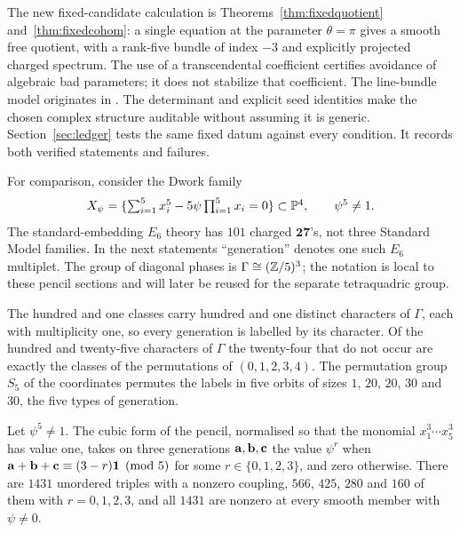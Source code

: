 The new fixed-candidate calculation is
Theorems~\ref{thm:fixedquotient} and~\ref{thm:fixedcohom}:
a single equation at the parameter $\theta=\pi$ gives a smooth free
quotient, with a rank-five bundle of index $-3$ and explicitly projected
charged spectrum. The use of a transcendental coefficient certifies
avoidance of algebraic bad parameters; it does not stabilize that
coefficient. The line-bundle model originates in \cite{BCL}.
The determinant and explicit seed identities make the chosen
complex structure auditable without assuming it is generic.
Section~\ref{sec:ledger} tests the same fixed datum against every
condition. It records both verified statements and failures.

For comparison, consider the Dwork family
\begin{equation}\label{eq:dwork}
 X_\psi=\{\textstyle\sum_{i=1}^5 x_i^5-5\psi\prod_{i=1}^5x_i=0\}
 \subset\mathbb{P}^4,\qquad\psi^5\ne1.
\end{equation}
The standard-embedding $E_6$ theory has $101$ charged $\mathbf{27}$'s,
not three Standard Model families. In the next statements ``generation''
denotes one such $E_6$ multiplet. The group of diagonal phases is
$\Gamma\cong(\mathbb{Z}/5)^3$; the notation is local to these pencil sections
and will later be reused for the separate tetraquadric group.


\begin{theorem}[Labels]\label{thm:A}
The hundred and one classes carry hundred and one distinct characters of
$\Gamma$, each with multiplicity one, so every generation is labelled by
its character. Of the hundred and twenty-five characters of $\Gamma$ the
twenty-four that do not occur are exactly the classes of the permutations
of $(0,1,2,3,4)$. The permutation group $S_5$ of the coordinates permutes
the labels in five orbits of sizes $1$, $20$, $20$, $30$ and $30$, the five
types of generation.
\end{theorem}

\begin{theorem}[Couplings]\label{thm:B}
Let $\psi^5\ne1$. The cubic form of the pencil, normalised so that the
monomial $x_1^3\cdots x_5^3$ has value one, takes on three generations
$\mathbf{a},\mathbf{b},\mathbf{c}$ the value $\psi^{r}$ when $\mathbf{a}+\mathbf{b}+\mathbf{c}\equiv(3-r)\mathbf{1}\pmod 5$
for some $r\in\{0,1,2,3\}$, and zero otherwise. There are $1431$ unordered
triples with a nonzero coupling, $566$, $425$, $280$ and $160$ of them with
$r=0,1,2,3$, and all $1431$ are nonzero at every smooth member with
$\psi\ne0$.
\end{theorem}

